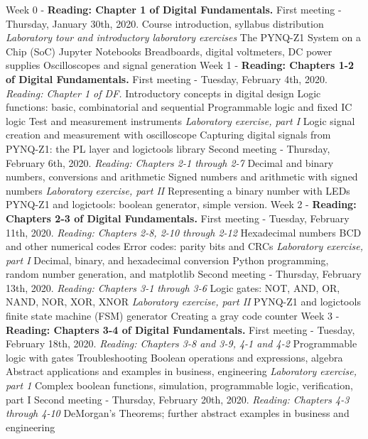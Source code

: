 \documentclass[10pt]{article}
\begin{document}
\begin{outline}[enumerate]
\1 Week 0 - \textbf{Reading: Chapter 1 of Digital Fundamentals.}
\2 First meeting - Thursday, January 30th, 2020.
\3 Course introduction, syllabus distribution
\3 \textit{Laboratory tour and introductory laboratory exercises}
\4 The PYNQ-Z1 System on a Chip (SoC)
\4 Jupyter Notebooks
\4 Breadboards, digital voltmeters, DC power supplies
\4 Oscilloscopes and signal generation
\1 Week 1 - \textbf{Reading: Chapters 1-2 of Digital Fundamentals.}
\2 First meeting - Tuesday, February 4th, 2020. \textit{Reading: Chapter 1 of DF.}
\3 Introductory concepts in digital design
\3 Logic functions: basic, combinatorial and sequential
\3 Programmable logic and fixed IC logic
\3 Test and measurement instruments
\3 \textit{Laboratory exercise, part I}
\4 Logic signal creation and measurement with oscilloscope
\4 Capturing digital signals from PYNQ-Z1: the PL layer and logictools library
\2 Second meeting - Thursday, February 6th, 2020. \textit{Reading: Chapters 2-1 through 2-7}
\3 Decimal and binary numbers, conversions and arithmetic
\3 Signed numbers and arithmetic with signed numbers
\3 \textit{Laboratory exercise, part II}
\4 Representing a binary number with LEDs
\4 PYNQ-Z1 and logictools: boolean generator, simple version.
\1 Week 2 - \textbf{Reading: Chapters 2-3 of Digital Fundamentals.}
\2 First meeting - Tuesday, February 11th, 2020.  \textit{Reading: Chapters 2-8, 2-10 through 2-12}
\3 Hexadecimal numbers
\3 BCD and other numerical codes
\3 Error codes: parity bits and CRCs
\3 \textit{Laboratory exercise, part I}
\4 Decimal, binary, and hexadecimal conversion
\4 Python programming, random number generation, and matplotlib
\2 Second meeting - Thursday, February 13th, 2020. \textit{Reading: Chapters 3-1 through 3-6}
\3 Logic gates: NOT, AND, OR, NAND, NOR, XOR, XNOR
\3 \textit{Laboratory exercise, part II}
\4 PYNQ-Z1 and logictools finite state machine (FSM) generator
\4 Creating a gray code counter
\1 Week 3 - \textbf{Reading: Chapters 3-4 of Digital Fundamentals.}
\2 First meeting - Tuesday, February 18th, 2020. \textit{Reading: Chapters 3-8 and 3-9, 4-1 and 4-2}
\3 Programmable logic with gates
\3 Troubleshooting
\3 Boolean operations and expressions, algebra
\3 Abstract applications and examples in business, engineering
\3 \textit{Laboratory exercise, part 1}
\4 Complex boolean functions, simulation, programmable logic, verification, part I
\2 Second meeting - Thursday, February 20th, 2020.  \textit{Reading: Chapters 4-3 through 4-10}
\3 DeMorgan's Theorems; further abstract examples in business and engineering

\end{outline}
\end{document}
